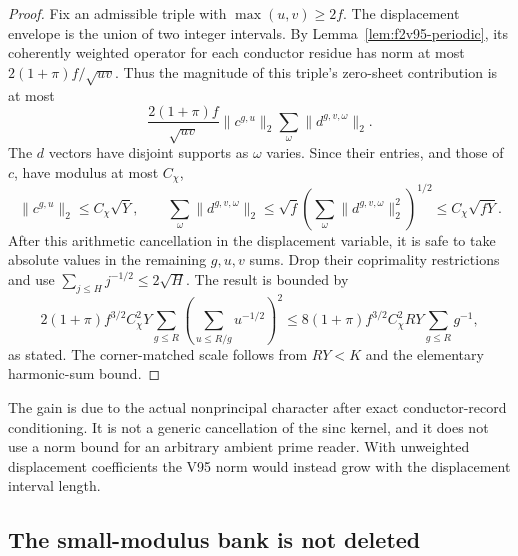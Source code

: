 \documentclass[11pt]{article}
\theoremstyle{definition}
\theoremstyle{remark}
\begin{document}
\begin{proof}
Fix an admissible triple with \(\max(u,v)\ge2f\).
The displacement envelope is the union of two integer intervals.
By Lemma~\ref{lem:f2v95-periodic}, its coherently weighted operator
for each conductor residue has norm at most
\(2(1+\pi)f/\sqrt{uv}\).  Thus the magnitude of this triple's
zero-sheet contribution is at most
\[
 \frac{2(1+\pi)f}{\sqrt{uv}}
       \|c^{g,u}\|_2\sum_\omega\|d^{g,v,\omega}\|_2.
\]
The \(d\) vectors have disjoint supports as \(\omega\) varies.
Since their entries, and those of \(c\), have modulus at most
\(C_\chi\),
\[
 \|c^{g,u}\|_2\le C_\chi\sqrt Y,\qquad
 \sum_\omega\|d^{g,v,\omega}\|_2
 \le\sqrt f\left(\sum_\omega\|d^{g,v,\omega}\|_2^2\right)^{1/2}
 \le C_\chi\sqrt{fY}.
\]
After this arithmetic cancellation in the displacement variable, it
is safe to take absolute values in the remaining \(g,u,v\) sums.
Drop their coprimality restrictions and use
\(\sum_{j\le H}j^{-1/2}\le2\sqrt H\).  The result is bounded by
\[
 2(1+\pi)f^{3/2}C_\chi^2Y
       \sum_{g\le R}
          \left(\sum_{u\le R/g}u^{-1/2}\right)^2
 \le8(1+\pi)f^{3/2}C_\chi^2RY\sum_{g\le R}g^{-1},
\]
as stated.  The corner-matched scale follows from \(RY<K\) and
the elementary harmonic-sum bound.
\end{proof}

The gain is due to the actual nonprincipal character after exact
conductor-record conditioning.  It is not a generic cancellation of
the sinc kernel, and it does not use a norm bound for an arbitrary
ambient prime reader.  With unweighted displacement coefficients the
V95 norm would instead grow with the displacement interval length.

\subsection{The small-modulus bank is not deleted}
\end{document}
